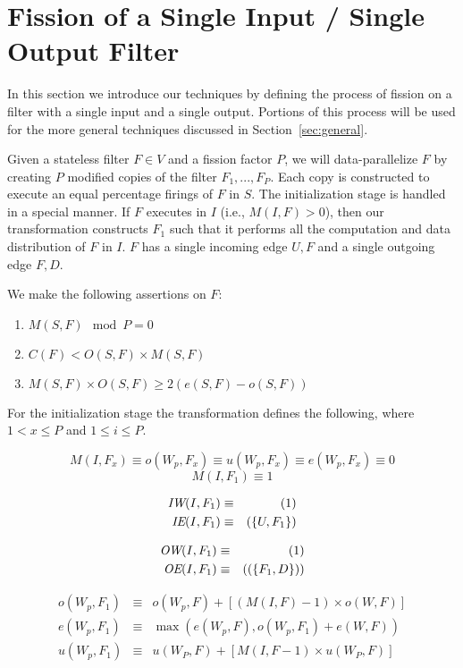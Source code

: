 \section{Fission of a Single Input / Single Output Filter}
\label{sec:single}

In this section we introduce our techniques by defining the
process of fission on a filter with a single input and a single
output. Portions of this process will be used for the more general
techniques discussed in Section~\ref{sec:general}. 

Given a stateless filter $F \in V$ and a fission factor $P$, we will
data-parallelize $F$ by creating $P$ modified copies of the filter
$F_1, ..., F_P$.  Each copy is constructed to execute an equal
percentage firings of $F$ in $S$.  The initialization stage is handled
in a special manner.  If $F$ executes in $I$ (i.e., $M(I,F) > 0$),
then our transformation constructs $F_1$ such that it performs all the
computation and data distribution of $F$ in $I$. $F$ has a single
incoming edge ${U,F}$ and a single outgoing edge ${F, D}$.


We make the following assertions on $F$:

\begin{enumerate}

\item $M(S,F) \mod  P = 0$

\item $C(F) < O(S,F) \times M(S,F)$

\item $M(S,F) \times O(S,F) \ge 2(e(S,F) - o(S,F))$

\end{enumerate}


For the initialization stage the transformation defines the following,
where $1 < x \le P$ and $1 \le i \le P$.

$$ M(I,F_x) \equiv o(W_p,F_x) \equiv u(W_p,F_x) \equiv e(W_p,F_x)
\equiv 0 $$
$$ M(I,F_1) \equiv 1 $$

\begin{eqnarray*}
\mbox{\it IW}(I,F_1) & \equiv & (1) \\
\mbox{\it IE}(I,F_1) & \equiv & (\{U,F_1\}) 
\end{eqnarray*}

\begin{eqnarray*} 
\mbox{\it OW}(I,F_1) & \equiv & (1) \\
\mbox{\it OE}(I,F_1) & \equiv & ((\{F_1, D\})) 
\end{eqnarray*} 

\begin{eqnarray*} 
o(W_p,F_1) & \equiv & o(W_p,F) + [(M(I,F) - 1) \times o(W,F)] \\
e(W_p,F_1) & \equiv & \max(e(W_p,F), o(W_p,F_1) + e(W,F)) \\
u(W_p,F_1) & \equiv & u(W_P,F) + [M(I,F - 1) \times u(W_P,F)]
\end{eqnarray*} 
